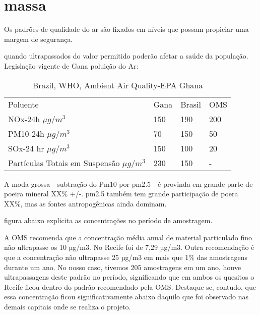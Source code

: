 \section{massa}


Os padrões de qualidade do ar são fixados em níveis que possam propiciar uma margem de segurança.

quando ultrapassados do valor permitido poderão afetar a saúde da população. 
Legislação vigente de Gana poluição do Ar:

\begin{table}[]
\centering
\caption{Brazil,  WHO, Ambient Air Quality-EPA Ghana}
\label{my-label}
\begin{tabular}{llll}
  Poluente                                   & Gana & Brasil & OMS \\
  NOx-24h $\mu g/m^3$                        & 150  & 190    & 200 \\
  PM10-24h $\mu g/m^3$                       & 70   & 150    & 50  \\
  SOx-24 hr $\mu g/m^3$                      & 150  & 100    & 20  \\
  Partículas Totais em Suspensão $\mu g/m^3$ & 230  & 150    & -  
\end{tabular}
\end{table}

A moda grossa - subtração do Pm10 por pm2.5 - é provinda em grande parte
de poeira mineral XX\% +/-. pm2.5 também tem grande participação de poera XX\%, 
mas as fontes antropogênicas ainda dominam.

figura abaixo explicita as concentrações no período de amostragem.


A OMS recomenda que a concentração média anual de material particulado 
fino não ultrapasse os 10 µg/m3. No Recife foi de 7,29 µg/m3. 
Outra recomendação é que a concentração não ultrapasse 25 µg/m3 em mais que 1\% 
das amostragens durante um ano. 
No nosso caso, tivemos 205 amostragens em um ano, houve ultrapassagens deste padrão no período,
 significando que em ambos os quesitos o Recife ficou dentro do padrão recomendado pela OMS. Destaque-se, contudo, que essa concentração ficou significativamente abaixo daquilo que foi observado nas demais capitais onde se realiza o projeto.

